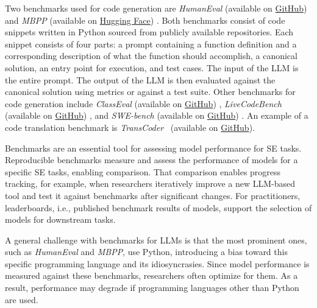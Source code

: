 
Two benchmarks used for code generation are \emph{HumanEval} (available on \href{https://github.com/openai/human-eval}{GitHub}) \cite{DBLP:conf/acl/PapineniRWZ02} and \emph{MBPP} (available on \href{https://huggingface.co/datasets/google-research-datasets/mbpp}{Hugging Face}) \cite{DBLP:journals/corr/abs-2108-07732}.
Both benchmarks consist of code snippets written in Python sourced from publicly available repositories.
Each snippet consists of four parts: a prompt containing a function definition and a corresponding description of what the function should accomplish, a canonical solution, an entry point for execution, and test cases.
The input of the LLM is the entire prompt.
The output of the LLM is then evaluated against the canonical solution using metrics or against a test suite.
Other benchmarks for code generation include \emph{ClassEval} (available on \href{https://github.com/FudanSELab/ClassEval}{GitHub}) \cite{DBLP:journals/corr/abs-2308-01861}, \emph{LiveCodeBench} (available on \href{https://github.com/LiveCodeBench/LiveCodeBench}{GitHub}) \cite{DBLP:journals/corr/abs-2403-07974}, and \emph{SWE-bench} (available on \href{https://github.com/swe-bench/SWE-bench}{GitHub}) \cite{DBLP:conf/iclr/JimenezYWYPPN24}.
An example of a code translation benchmark is \emph{TransCoder}~\cite{DBLP:journals/corr/abs-2006-03511} (available on \href{https://github.com/facebookresearch/CodeGen}{GitHub}). 


Benchmarks are an essential tool for assessing model performance for SE tasks.
Reproducible benchmarks measure and assess the performance of models for a specific SE tasks, enabling comparison.
That comparison enables progress tracking, for example, when researchers iteratively improve a new LLM-based tool and test it against benchmarks after significant changes.
For practitioners, leaderboards, i.e., published benchmark results of models, support the selection of models for downstream tasks.


A general challenge with benchmarks for LLMs is that the most prominent ones, such as \emph{HumanEval} and \emph{MBPP}, use Python, introducing a bias toward this specific programming language and its idiosyncrasies.
Since model performance is measured against these benchmarks, researchers often optimize for them.
As a result, performance may degrade if programming languages other than Python are used.

